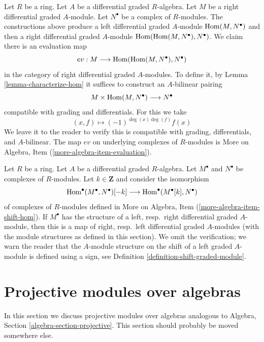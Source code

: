 \begin{remark}
\label{remark-evaluation-map-right}
Let $R$ be a ring. Let $A$ be a differential graded $R$-algebra.
Let $M$ be a right differential graded $A$-module. Let
$N^\bullet$ be a complex of $R$-modules. The constructions above
produce a left differential graded $A$-module $\mathop{\mathrm{Hom}}\nolimits(M, N^\bullet)$
and then a right differential graded $A$-module
$\mathop{\mathrm{Hom}}\nolimits(\mathop{\mathrm{Hom}}\nolimits(M, N^\bullet), N^\bullet)$. We claim there is an evaluation map
$$
ev : M \longrightarrow \mathop{\mathrm{Hom}}\nolimits(\mathop{\mathrm{Hom}}\nolimits(M, N^\bullet), N^\bullet)
$$
in the category of right differential graded $A$-modules. To define it, by
Lemma \ref{lemma-characterize-hom} it suffices to construct an
$A$-bilinear pairing
$$
M \times \mathop{\mathrm{Hom}}\nolimits(M, N^\bullet) \longrightarrow N^\bullet
$$
compatible with grading and differentials. For this we take
$$
(x, f) \longmapsto (-1)^{\deg(x)\deg(f)}f(x)
$$
We leave it to the reader to verify this is compatible with grading,
differentials, and $A$-bilinear. The map $ev$ on underlying complexes
of $R$-modules is More on Algebra, Item (\ref{more-algebra-item-evaluation}).
\end{remark}

\begin{remark}
\label{remark-shift-dual}
Let $R$ be a ring. Let $A$ be a differential graded $R$-algebra.
Let $M^\bullet$ and $N^\bullet$ be complexes of $R$-modules.
Let $k \in \mathbf{Z}$ and consider the isomorphism
$$
\mathop{\mathrm{Hom}}\nolimits^\bullet(M^\bullet, N^\bullet)[-k]
\longrightarrow
\mathop{\mathrm{Hom}}\nolimits^\bullet(M^\bullet[k], N^\bullet)
$$
of complexes of $R$-modules defined in
More on Algebra, Item (\ref{more-algebra-item-shift-hom}).
If $M^\bullet$ has the structure of a left, resp.\ right
differential graded $A$-module, then this is a map of
right, resp.\ left differential graded $A$-modules (with the
module structures as defined in this section).
We omit the verification; we warn the reader that the
$A$-module structure on the shift of a left graded $A$-module
is defined using a sign, see
Definition \ref{definition-shift-graded-module}.
\end{remark}






\section{Projective modules over algebras}
\label{section-projectives-over-algebras}

\noindent
In this section we discuss projective modules over algebras analogous to
Algebra, Section \ref{algebra-section-projective}.
This section should probably be moved somewhere else.

